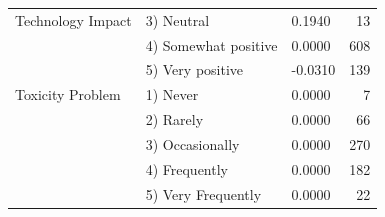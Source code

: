 \begin{table}[t]
\begin{tabular}{lllr}
Technology Impact & 3) Neutral & 0.1940 & 13 \\
 & 4) Somewhat positive & 0.0000 & 608 \\
 & 5) Very positive & -0.0310 & 139 \\
Toxicity Problem & 1) Never & 0.0000 & 7 \\
 & 2) Rarely & 0.0000 & 66 \\
 & 3) Occasionally & 0.0000 & 270 \\
 & 4) Frequently & 0.0000 & 182 \\
 & 5) Very Frequently & 0.0000 & 22 \\
\bottomrule
\end{tabular}
\end{table}
